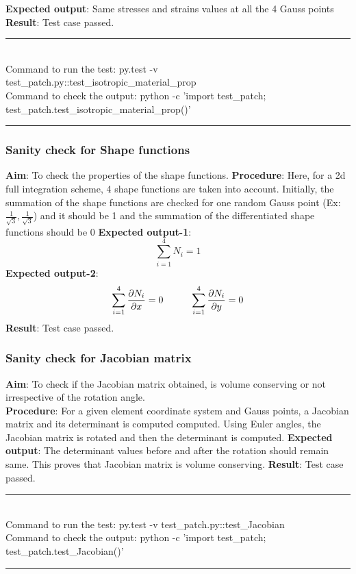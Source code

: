 \documentclass[fleqn, 12.5pt,a4paper]{report}
\begin{document}
\hspace{-0.5cm}\textbf{Expected output}: Same stresses and strains values at all the 4 Gauss points\newline
\textbf{Result}: Test case passed.
\\
{\rule{\linewidth}{0.02cm}}\\
Command to run the test: {\selectfont py.test -v  test{\_}patch.py::test{\_}isotropic{\_}material{\_}prop}\\
Command to check the output: {\selectfont python -c 'import test{\_}patch;\\
test{\_}patch.test{\_}isotropic{\_}material{\_}prop()'}\\
{\rule{\linewidth}{0.02cm}}

\subsubsection{Sanity check for Shape functions}
\textbf{Aim}: To check the properties of the shape functions\cite{pandey2019new}.\newline
\textbf{Procedure}: Here, for a 2d full integration scheme, 4 shape functions are taken into account. Initially, the summation of the shape functions are checked for one random Gauss point (Ex: $\frac{1}{\sqrt3}, \frac{1}{\sqrt3}$) and it should be 1 and the summation of the differentiated shape functions should be 0\newline  
\textbf{Expected output-1}: $$\sum_{i=1}^{4} N_i= 1$$
\textbf{Expected output-2}: $$\sum_{i=1}^{4} \pdv{N_i}{x}= 0 \hspace{1cm} \sum_{i=1}^{4} \pdv{N_i}{y}= 0$$
\textbf{Result}: Test case passed.

\subsubsection{Sanity check for Jacobian matrix}
\textbf{Aim}: To check if the Jacobian matrix obtained, is volume conserving or not irrespective of the rotation angle\cite{taylor2014feap}.\\
\textbf{Procedure}: For a given element coordinate system and Gauss points, a Jacobian matrix and its determinant is computed computed. Using Euler angles, the Jacobian matrix is rotated and then the determinant is computed.\newline 
\textbf{Expected output}: The determinant values before and after the rotation should remain same. This proves that Jacobian matrix is volume conserving. \newline
\textbf{Result}: Test case passed.
\\
{\rule{\linewidth}{0.02cm}}\\
Command to run the test: {\selectfont py.test -v test{\_}patch.py::test{\_}Jacobian}\\
Command to check the output: {\selectfont python -c 'import test{\_}patch;\\ test{\_}patch.test{\_}Jacobian()'}\\
{\rule{\linewidth}{0.02cm}}
\end{document}
